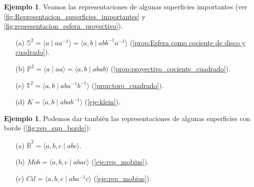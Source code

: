 \documentclass[10pt]{report}
\newcommand{\Toro}{\mathbb{T}^2}
\theoremstyle{definition}
\newtheorem{eje}[defin]{Ejemplo}
\begin{document}
\begin{eje}\label{eje:rep_sup_importantes}%
Veamos las representaciones de algunas superficies importantes (ver \autoref{fig:Representacion_superficies_importantes} y \autoref{fig:representacion_esfera_proyectivo}).
\begin{itemize}
\item[(a)] $\mathbb{S}^2=\langle a\mid aa^{-1}\rangle=\langle a,b\mid  abb^{-1}a^{-1}\rangle$ (\autoref{prop:Esfera como cociente de disco y cuadrado}).
\item[(b)] $\mathbb{P}^2= \langle a\mid aa \rangle = \langle a,b\mid abab \rangle$ (\autoref{prop:proyectivo_cociente_cuadrado}).
\item[(c)] $\Toro=\langle a,b\mid aba^{-1}b^{-1}\rangle$ (\autoref{prop:toro_cuadrado}).
\item[(d)] $K=\langle a,b\mid abab^{-1} \rangle$ (\autoref{eje:klein}).
\end{itemize}
\end{eje}

\begin{eje}%
Podemos dar también las representaciones de algunas superficies con borde (\autoref{fig:rep_sup_borde}):
\begin{itemize}
\item[(a)] $\overline{\mathbb{B}}^2=\langle a,b,c\mid abc\rangle$.
\item[(b)] $Mob=\langle a,b,c\mid abac\rangle$ (\autoref{eje:rep_mobius}).
\item[(c)] $Cil=\langle a,b,c\mid aba^{-1}c\rangle$ (\autoref{eje:rep_mobius}).
\end{itemize}
\end{eje}
\end{document}
